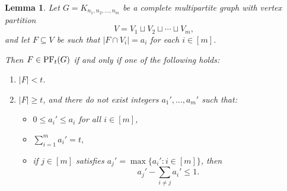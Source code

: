 \documentclass[12pt,reqno]{amsart}
\newtheorem{lemma}[lemma]{Lemma}
\theoremstyle{definition}
\newcommand{\PF}{{\rm PF}}
\begin{document}
\begin{lemma}\label{lem: faces for CMG}
Let $G=K_{n_1, n_2, \dots, n_m}$ be a complete multipartite graph with vertex partition
\[
V = V_1 \sqcup V_2 \sqcup \cdots \sqcup V_m,
\]
and let $F \subseteq V$ be such that $|F \cap V_i| = a_i$ for each $i \in [m]$.

Then $F \in \PF_t(G)$ if and only if one of the following holds:
\begin{enumerate}
    \item $|F| < t$.

    \item $|F| \ge t$, and there do not exist integers $a_1', \dots, a_m'$ such that:
    \begin{itemize}
        \item $0 \le a_i' \le a_i$ for all $i \in [m]$,
        \item $\displaystyle \sum_{i=1}^m a_i' = t,$
        \item if $j \in [m]$ satisfies $a_j' = \max\{a_i' : i \in [m]\}$, then
        \[
        a_j' - \sum_{i \neq j} a_i' \le 1.
        \]
    \end{itemize}
\end{enumerate}
\end{lemma}
\end{document}
